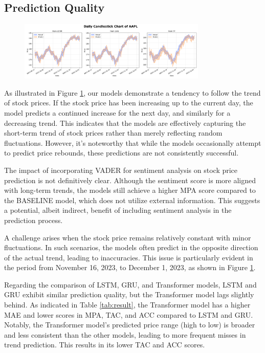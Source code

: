 \subsection{Prediction Quality}

\begin{figure}
	\centering
	\includegraphics[width=0.8\textwidth]{Fig/unstable_AAPL.png}
	\caption{}{}
	\label{fig:AAPL}
\end{figure}

As illustrated in Figure \ref{fig:AAPL}, our models demonstrate a tendency to follow the trend of stock prices. 
If the stock price has been increasing up to the current day, the model predicts a continued increase for the next day, and similarly for a decreasing trend. 
This indicates that the models are effectively capturing the short-term trend of stock prices rather than merely reflecting random fluctuations. 
However, it's noteworthy that while the models occasionally attempt to predict price rebounds, these predictions are not consistently successful.

The impact of incorporating VADER for sentiment analysis on stock price prediction is not definitively clear. 
Although the sentiment score is more aligned with long-term trends, the models still achieve a higher MPA score compared to the BASELINE model, which does not utilize external information. 
This suggests a potential, albeit indirect, benefit of including sentiment analysis in the prediction process.

A challenge arises when the stock price remains relatively constant with minor fluctuations. 
In such scenarios, the models often predict in the opposite direction of the actual trend, leading to inaccuracies. 
This issue is particularly evident in the period from November 16, 2023, to December 1, 2023, as shown in Figure \ref{fig:AAPL}.

Regarding the comparison of LSTM, GRU, and Transformer models, LSTM and GRU exhibit similar prediction quality, but the Transformer model lags slightly behind. 
As indicated in Table \ref{tab:result}, the Transformer model has a higher MAE and lower scores in MPA, TAC, and ACC compared to LSTM and GRU. 
Notably, the Transformer model's predicted price range (high to low) is broader and less consistent than the other models, leading to more frequent misses in trend prediction. This results in its lower TAC and ACC scores.

